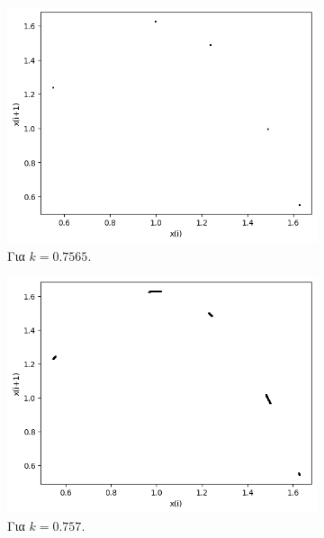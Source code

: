 \begin{figure}[h!]
\begin{subfigure}[b]{0.4\textwidth}
		\includegraphics[width=\textwidth]{LateX images/graphs q14/g21}
		\caption{Για $k=0.7565$.}
		\label{f:k78}
	\end{subfigure}
	\hfill
	\begin{subfigure}[b]{0.4\textwidth}
		\centering
		\includegraphics[width=\textwidth]{LateX images/graphs q14/g22}
		\caption{Για $k=0.757$.}
		\label{f:k79}
	\end{subfigure}
	\hfill	
	\begin{subfigure}[b]{0.4\textwidth}
		\centering

\end{subfigure}
\end{figure}
